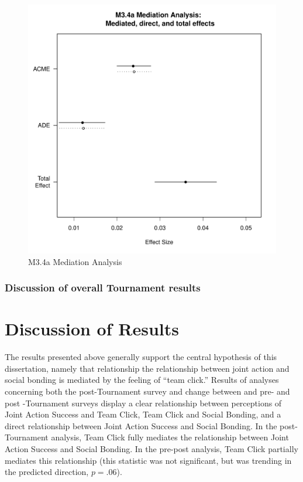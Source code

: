 \begin{figure}[htbp]
  \includegraphics[width =\columnwidth]{images/MLM34aMediationAnalysis.pdf}
  \caption{M3.4a Mediation Analysis}
  \label{fig:MLM34aMediationAnalysis}
\end{figure}


\subsubsection{Discussion of overall Tournament results}





  \section{Discussion of Results}

  The results presented above generally support the central hypothesis of this dissertation, namely that relationship the relationship between joint action and social bonding is mediated by the feeling of ``team click.''  Results of analyses concerning both the post-Tournament survey and change between and pre- and post -Tournament surveys display a clear relationship between perceptions of Joint Action Success and Team Click, Team Click and Social Bonding, and a direct relationship between Joint Action Success and Social Bonding.  In the post-Tournament analysis, Team Click fully mediates the relationship between Joint Action Success and Social Bonding. In the pre-post analysis, Team Click partially mediates this relationship (this statistic was not significant, but was trending in the predicted direction, $p = .06$).

